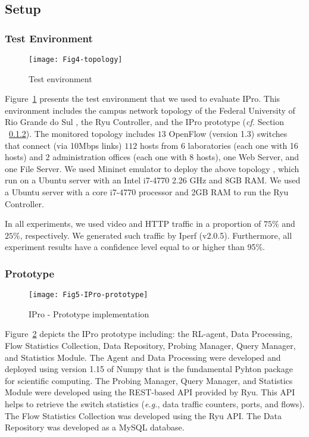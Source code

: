 \subsection{Setup}
\subsubsection{Test Environment}
\label{subsec:setup}

\begin{figure}[H]
    \centering
    \texttt{[image: Fig4-topology]}
    \caption{Test environment}
    \label{fig:campus_topo}
\end{figure}

Figure~\ref{fig:campus_topo} presents the test environment that we used to evaluate IPro. This environment includes the campus network topology of the Federal University of Rio Grande do Sul \cite{isolani_2015:interactive}, the Ryu Controller, and the IPro prototype (\textit{cf.} Section ~\ref{subsec:prototype}). The monitored topology includes $13$ OpenFlow (version 1.3) switches that connect (via 10Mbps links) $112$ hosts from $6$ laboratories (each one with 16 hosts) and $2$ administration offices (each one with $8$ hosts), one Web Server, and one File Server.  We used Mininet emulator to deploy the above topology \cite{lantz_2010:mininet}, which run on a Ubuntu server with an Intel i7-4770 2.26 GHz and 8GB RAM. We used a Ubuntu server with a core i7-4770 processor and 2GB RAM to run the Ryu Controller.

In all experiments, we used video and HTTP traffic in a proportion of $75\%$ and $25\%$, respectively. We generated such traffic by Iperf (v2.0.5). Furthermore, all experiment results have a confidence level equal to or higher than 95\%. 

\subsubsection{Prototype}
\label{subsec:prototype}
\begin{figure}[H]
    \centering
    \texttt{[image: Fig5-IPro-prototype]}
    \caption{IPro - Prototype implementation}
    \label{fig:prototype_ipro}
\end{figure}

Figure~\ref{fig:prototype_ipro} depicts the IPro prototype including: the RL-agent, Data Processing, Flow Statistics Collection, Data Repository, Probing Manager, Query Manager, and Statistics Module. The Agent and Data Processing were developed and deployed using version 1.15 of Numpy that is the fundamental Pyhton package for scientific computing. The Probing Manager, Query Manager, and Statistics Module were developed using the REST-based API provided by Ryu. This API helps to retrieve the switch statistics (\textit{e.g.}, data traffic counters, ports, and flows). The Flow Statistics Collection was developed using the Ryu API. The Data Repository was developed as a MySQL database.

